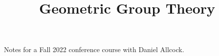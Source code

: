 \documentclass[fontsize=9pt]{article}
\title{Geometric Group Theory}
\begin{document}
\maketitle
Notes for a Fall 2022 conference course with Daniel Allcock. 
\tableofcontents
\newpage
     
     
\clearpage
\printbibliography
\end{document}
